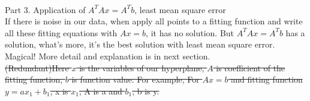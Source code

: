 \documentclass{article}
\begin{document}
\begin{spacing}{1.5}
\\Part 3. Application of $A^TAx=A^Tb$, least mean square error\\
If there is noise in our data, when apply all points to a fitting function and write all these fitting equations with $Ax=b$, it has no solution. But $A^TAx=A^Tb$ has a solution, what's more, it's the best solution with least mean square error. Magical! More detail and explanation is in next section.\\
\sout{(Redundant)Here $x$ is the variables of our hyperplane, $A$ is coefficient of the fitting function, $b$ is function value. For example, For $Ax=b$ and fitting function $y=ax_1+b_1$, x is $x_1$, A is a and $b_1$, b is y. }\par
\end{spacing}
\end{document}
